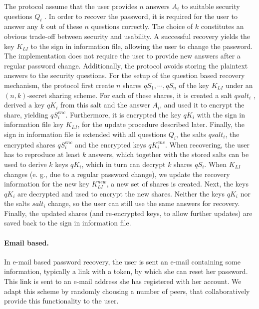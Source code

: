  The protocol assume that the user provides $n$ answers $A_i$ to suitable
 security questions $Q_i$ . In order to recover the password, it is
 required for the user to answer any $k$ out of these $n$ questions
 correctly. The choice of $k$ constitutes an obvious trade-off
 between security and usability. A successful recovery yields
 the key $K_{LI}$ to the sign in information file, allowing the user to
change the password. The implementation
does not require the user to provide new answers after a regular
 password change. Additionally, the protocol avoids storing the plaintext
 answers to the security questions.
 For the setup of the question based recovery mechanism, the protocol first
create $n$ shares $qS_1, \cdots, qS_n$ of the
 key $K_{LI}$ under an $(n, k)$-secret sharing scheme. For each of
 these shares, it is created a salt $qsalt_i$ , derived a key $qK_i$ from
 this salt and the answer $A_i$, and used it to encrypt the share,
 yielding $qS^{enc}_i$. Furthermore, it is encrypted the key $qK_i$ with
 the sign in information file key $K_{LI}$, for the update procedure
 described later. Finally, the sign in information file is extended
 with all questions $Q_i$, the salts $qsalt_i$, the encrypted shares
 $qS_i^{enc}$ and the encrypted keys $qK_i^{enc}$. When recovering, the
 user has to reproduce at least $k$ answers, which together with
 the stored salts can be used to derive $k$ keys $qK_i$, which in
 turn can decrypt $k$ shares $qS_i$.
 When $K_{LI}$ changes (e. g., due to a regular password
 change), we update the recovery information %
 for the new key $K_{LI}^{new}$, a new set of shares is created.
 Next, the keys $qK_i$ are decrypted and used to encrypt the new
 shares. Neither the keys $qK_i$ nor the salts $salt_i$ change, so
 the user can still use the same answers for recovery. Finally,
 the updated shares (and re-encrypted keys, to allow further
 updates) are saved back to the sign in information file.

\paragraph{Email based.}

  In e-mail based password recovery, the user is sent an e-mail
 containing some information, typically a link with a token, by
 which she can reset her password. This link is sent to an e-mail
 address she has registered with her account.
 We adapt this scheme by randomly choosing a number of
 peers, that collaboratively provide this functionality to the user.
 

